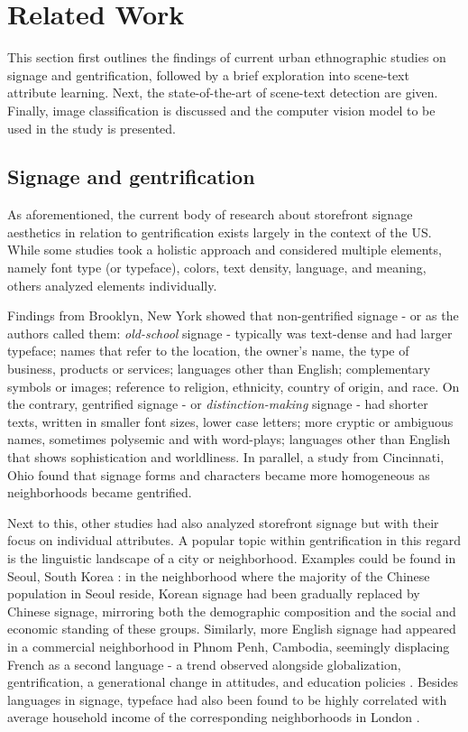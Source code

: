 \section{Related Work}
\label{sec:related_work}

This section first outlines the findings of current urban ethnographic studies on signage and gentrification, followed by a brief exploration into scene-text attribute learning. Next, the state-of-the-art of scene-text detection are given. Finally, image classification is discussed and the computer vision model to be used in the study is presented.

\subsection{Signage and gentrification}

As aforementioned, the current body of research about storefront signage aesthetics in relation to gentrification exists largely in the context of the US. While some studies took a holistic approach and considered multiple elements, namely font type (or typeface), colors, text density, language, and meaning, others analyzed elements individually.

Findings from Brooklyn, New York\cite{trinch_signsays_2017, snajdr_oldschool_2018, snajdr_preserve_2022} showed that non-gentrified signage - or as the authors called them: \textit{old-school} signage - typically was text-dense and had larger typeface; names that refer to the location, the owner's name, the type of business, products or services; languages other than English; complementary symbols or images; reference to religion, ethnicity, country of origin, and race. On the contrary, gentrified signage - or \textit{distinction-making} signage - had shorter texts, written in smaller font sizes, lower case letters; more cryptic or ambiguous names, sometimes polysemic and with word-plays; languages other than English that shows sophistication and worldliness. In parallel, a study from Cincinnati, Ohio \cite{rahman_signage_2020} found that signage forms and characters became more homogeneous as neighborhoods became gentrified.

Next to this, other studies had also analyzed storefront signage but with their focus on individual attributes. A popular topic within gentrification in this regard is the linguistic landscape of a city or neighborhood. Examples could be found in Seoul, South Korea \cite{hong_linguistic_2020}: in the neighborhood where the majority of the Chinese population in Seoul reside, Korean signage had been gradually replaced by Chinese signage, mirroring both the demographic composition and the social and economic standing of these groups. Similarly, more English signage had appeared in a commercial neighborhood in Phnom Penh, Cambodia, seemingly displacing French as a second language - a trend observed alongside globalization, gentrification, a generational change in attitudes, and education policies \cite{kasanga_map_2012}. Besides languages in signage, typeface had also been found to be highly correlated with average household income of the corresponding neighborhoods in London \cite{ma_typef_2019}.

